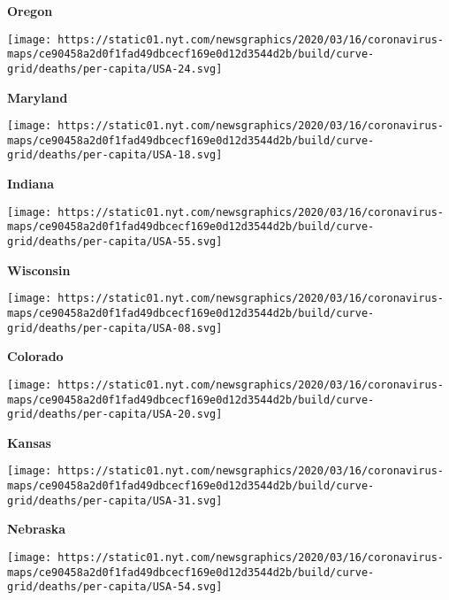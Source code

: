 \textbf{Oregon}

\href{https://www.nytimes.com/interactive/2020/us/maryland-coronavirus-cases.html}{}

\texttt{[image: https://static01.nyt.com/newsgraphics/2020/03/16/coronavirus-maps/ce90458a2d0f1fad49dbcecf169e0d12d3544d2b/build/curve-grid/deaths/per-capita/USA-24.svg]}

\textbf{Maryland}

\href{https://www.nytimes.com/interactive/2020/us/indiana-coronavirus-cases.html}{}

\texttt{[image: https://static01.nyt.com/newsgraphics/2020/03/16/coronavirus-maps/ce90458a2d0f1fad49dbcecf169e0d12d3544d2b/build/curve-grid/deaths/per-capita/USA-18.svg]}

\textbf{Indiana}

\href{https://www.nytimes.com/interactive/2020/us/wisconsin-coronavirus-cases.html}{}

\texttt{[image: https://static01.nyt.com/newsgraphics/2020/03/16/coronavirus-maps/ce90458a2d0f1fad49dbcecf169e0d12d3544d2b/build/curve-grid/deaths/per-capita/USA-55.svg]}

\textbf{Wisconsin}

\href{https://www.nytimes.com/interactive/2020/us/colorado-coronavirus-cases.html}{}

\texttt{[image: https://static01.nyt.com/newsgraphics/2020/03/16/coronavirus-maps/ce90458a2d0f1fad49dbcecf169e0d12d3544d2b/build/curve-grid/deaths/per-capita/USA-08.svg]}

\textbf{Colorado}

\href{https://www.nytimes.com/interactive/2020/us/kansas-coronavirus-cases.html}{}

\texttt{[image: https://static01.nyt.com/newsgraphics/2020/03/16/coronavirus-maps/ce90458a2d0f1fad49dbcecf169e0d12d3544d2b/build/curve-grid/deaths/per-capita/USA-20.svg]}

\textbf{Kansas}

\href{https://www.nytimes.com/interactive/2020/us/nebraska-coronavirus-cases.html}{}

\texttt{[image: https://static01.nyt.com/newsgraphics/2020/03/16/coronavirus-maps/ce90458a2d0f1fad49dbcecf169e0d12d3544d2b/build/curve-grid/deaths/per-capita/USA-31.svg]}

\textbf{Nebraska}

\href{https://www.nytimes.com/interactive/2020/us/west-virginia-coronavirus-cases.html}{}

\texttt{[image: https://static01.nyt.com/newsgraphics/2020/03/16/coronavirus-maps/ce90458a2d0f1fad49dbcecf169e0d12d3544d2b/build/curve-grid/deaths/per-capita/USA-54.svg]}

